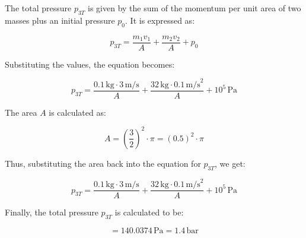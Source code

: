 The total pressure \( p_{3T} \) is given by the sum of the momentum per unit area of two masses plus an initial pressure \( p_0 \). It is expressed as:

\[ p_{3T} = \frac{m_{1}v_{1}}{A} + \frac{m_{2}v_{2}}{A} + p_{0} \]

Substituting the values, the equation becomes:

\[ p_{3T} = \frac{0.1 \, \text{kg} \cdot 3 \, \text{m/s}}{A} + \frac{32 \, \text{kg} \cdot 0.1 \, \text{m/s}^2}{A} + 10^5 \, \text{Pa} \]

The area \( A \) is calculated as:

\[ A = \left(\frac{3}{2}\right)^2 \cdot \pi = (0.5)^2 \cdot \pi \]

Thus, substituting the area back into the equation for \( p_{3T} \), we get:

\[ p_{3T} = \frac{0.1 \, \text{kg} \cdot 3 \, \text{m/s}}{A} + \frac{32 \, \text{kg} \cdot 0.1 \, \text{m/s}^2}{A} + 10^5 \, \text{Pa} \]

Finally, the total pressure \( p_{3T} \) is calculated to be:

\[ = 140.0374 \, \text{Pa} = 1.4 \, \text{bar} \]